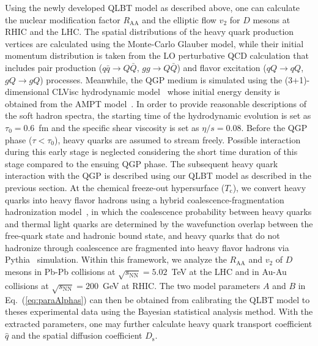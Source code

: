 \documentclass[aps,superscriptaddress,prc,twocolumn,nofootinbib]{revtex4}
\begin{document}
Using the newly developed QLBT model as described above, one can calculate the nuclear modification factor $R_\mathrm{AA}$ and the elliptic flow $v_2$ for $D$ mesons at RHIC and the LHC. The spatial distributions of the heavy quark production vertices are calculated using the Monte-Carlo Glauber model, while their initial momentum distribution is taken from the LO perturbative QCD calculation that includes pair production ($q\bar{q}\rightarrow Q\bar{Q}$, $gg\rightarrow Q\bar{Q}$) and flavor excitation ($qQ\rightarrow qQ$, $gQ\rightarrow gQ$) processes. Meanwhile, the QGP medium is simulated using the (3+1)-dimensional CLVisc hydrodynamic model~\cite {Pang:2018zzo,Wu:2018cpc} whose initial energy density is obtained from the AMPT model~\cite{Lin:2004en}. In order to provide reasonable descriptions of the soft hadron spectra, the starting time of the hydrodynamic evolution is set as $\tau_0=0.6$~fm and the specific shear viscosity is set as $\eta/s=0.08$.
Before the QGP phase ($\tau < \tau_0$), heavy quarks are assumed to stream freely. Possible interaction during this early stage \cite{Mrowczynski:2017kso, Carrington:2020sww} is neglected considering the short time duration of this stage compared to the ensuing QGP phase. The subsequent heavy quark interaction with the QGP is described using our QLBT model as described in the previous section. At the chemical freeze-out hypersurface ($T_\mathrm{c}$), we convert heavy quarks into heavy flavor hadrons using a hybrid coalescence-fragmentation hadronization model~\cite{Cao:2019iqs}, in which the coalescence probability between heavy quarks and thermal light quarks are determined by the wavefunction overlap between the free-quark state and hadronic bound state, and heavy quarks that do not hadronize through coalescence are fragmented into heavy flavor hadrons via Pythia~\cite{Sjostrand:2006za} simulation. Within this framework, we analyze the $R_\mathrm{AA}$ and $v_2$ of $D$ mesons in Pb-Pb collisions at $\sqrt{s_\mathrm{NN}} = 5.02$~TeV at the LHC and in Au-Au collisions at $\sqrt{s_\mathrm{NN}}= 200$~GeV at RHIC. The two model parameters $A$ and $B$ in Eq.~(\ref{eq:paraAlphas}) can then be obtained from calibrating the QLBT model to theses experimental data using the Bayesian statistical analysis method.
With the extracted parameters, one may further calculate heavy quark transport coefficient $\hat{q}$ and the spatial diffusion coefficient $D_\mathrm{s}$.
\end{document}
